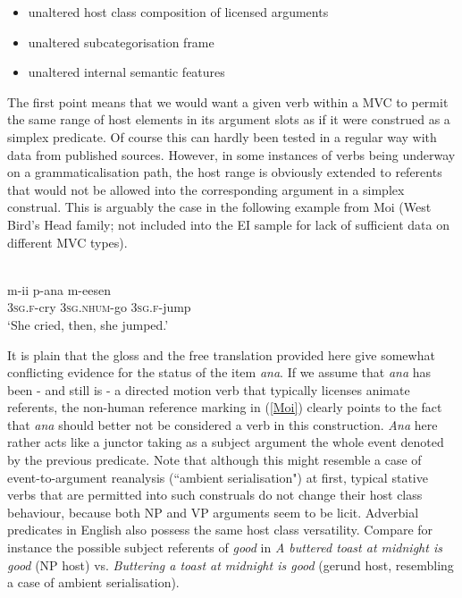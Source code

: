 \begin{itemize}
\item unaltered host class composition of licensed arguments
\item unaltered subcategorisation frame
\item unaltered internal semantic features
\end{itemize}
	
The first point means that we would want a given verb within a MVC to permit the same range of host elements in its argument slots as if it were construed as a simplex predicate. Of course this can hardly been tested in a regular way with data from published sources. However, in some instances of verbs being underway on a grammaticalisation path, the host range is obviously extended to referents that would not be allowed into the corresponding argument in a simplex construal. This is arguably the case in the following example from Moi (West Bird's Head family; not included into the EI sample for lack of sufficient data on different MVC types).

\ea \label{Moi}
\\
\gll m-ii p-ana m-eesen \\
3\textsc{sg}.\textsc{f}-cry 3\textsc{sg}.\textsc{nhum}-go 3\textsc{sg}.\textsc{f}-jump \\
\glft `She cried, then, she jumped.’\\ 
\z

It is plain that the gloss and the free translation provided here give somewhat conflicting evidence for the status of the item \textit{ana}. If we assume that \textit{ana} has been - and still is - a directed motion verb that typically licenses animate referents, the non-human reference marking in (\ref{Moi}) clearly points to the fact that \textit{ana} should better not be considered a verb in this construction. \textit{Ana} here rather acts like a junctor taking as a subject argument the whole event denoted by the previous predicate. Note that although this might resemble a case of event-to-argument reanalysis (``ambient serialisation") at first, typical stative verbs that are permitted into such construals do not change their host class behaviour, because both NP and VP arguments seem to be licit. Adverbial predicates in English also possess the same host class versatility. Compare for instance the possible subject referents of \textit{good} in \textit{A buttered toast at midnight is good} (NP host) vs. \textit{Buttering a toast at midnight is good} (gerund host, resembling a case of ambient serialisation).

